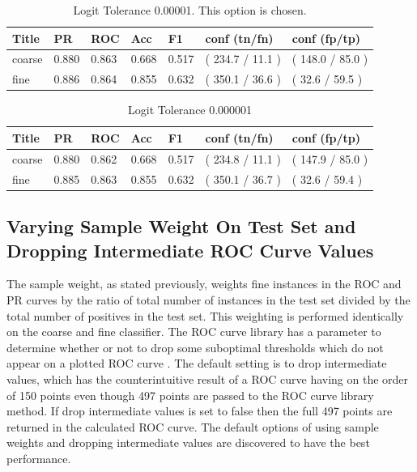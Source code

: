 \documentclass[ms]{nuthesis}
\begin{document}
\FloatBarrier
\begin{table}[h]
\centering
\caption{Logit Tolerance 0.00001. This option is chosen.}
\label{tab:LogReg-00001Redo}
\begin{tabular}{|l||l||l||l||l||l||l|}\toprule
Title & PR & ROC & Acc & F1 & conf (tn/fn) & conf (fp/tp) \\ \midrule
coarse & 0.880 & 0.863 & 0.668 & 0.517 & ( 234.7 / 11.1 ) & ( 148.0 / 85.0 ) \\
fine & 0.886 & 0.864 & 0.855 & 0.632 & ( 350.1 / 36.6 ) & ( 32.6 / 59.5 ) \\ \bottomrule
\end{tabular}
\end{table}
\FloatBarrier



\FloatBarrier
\begin{table}[H]
\centering
\caption{Logit Tolerance 0.000001}
\label{tab:LogReg-000001}
\begin{tabular}{|l||l||l||l||l||l||l|}\toprule
Title & PR & ROC & Acc & F1 & conf (tn/fn) & conf (fp/tp) \\ \midrule
coarse & 0.880 & 0.862 & 0.668 & 0.517 & ( 234.8 / 11.1 ) & ( 147.9 / 85.0 ) \\
fine & 0.885 & 0.863 & 0.855 & 0.632 & ( 350.1 / 36.7 ) & ( 32.6 / 59.4 ) \\ \bottomrule
\end{tabular}
\end{table}
\FloatBarrier

\subsection{Varying Sample Weight On Test Set and Dropping Intermediate ROC Curve Values}
\par The sample weight, as stated previously, weights fine instances in the ROC and PR curves by the ratio of
total number of instances in the test set divided by the total number of positives in the test set. This
weighting is performed identically on the coarse and fine classifier. The ROC curve library has a parameter to determine
whether or not to drop some suboptimal thresholds which do not appear on a plotted ROC curve \cite{scikit-learn}. The
default setting is to drop intermediate values, which has the counterintuitive result of a ROC curve having on the order of
150 points even though 497 points are passed to the ROC curve library method. If drop intermediate values is set to false
then the full 497 points are returned in the calculated ROC curve. The default
options of using sample weights and dropping intermediate values are discovered to have the
best performance.
\end{document}
